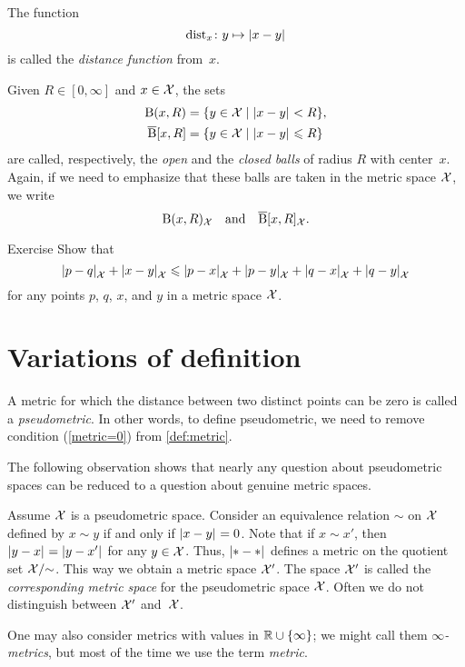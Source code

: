 The function 
\[\distfun_x\:y\mapsto \dist{x}{y}{}\]
is called the \emph{distance function} from~$x$. 

Given $R\in[0,\infty]$ and $x\in \mathcal{X}$, the sets
\begin{align*}
\oBall(x,R)&=\{y\in \spc{X}\mid \dist{x}{y}{}<R\},
\\
\cBall[x,R]&=\{y\in \spc{X}\mid \dist{x}{y}{}\le R\}
\end{align*}
are called, respectively, the  \emph{open} and  the \emph{closed  balls}   of radius $R$ with center~$x$.
Again, if we need to emphasize that these balls are taken in the metric space $\mathcal{X}$,
we write 
\[\mathrm{B}{}(x,R)_{\mathcal{X}}\quad\text{and}\quad\overline{\mathrm{B}}{}[x,R]_{\mathcal{X}}.\]

\begin{thm}{Exercise}
Show that
\[\dist{p}{q}{\spc{X}}+\dist{x}{y}{\spc{X}}\le\dist{p}{x}{\spc{X}}+\dist{p}{y}{\spc{X}}+\dist{q}{x}{\spc{X}}+\dist{q}{y}{\spc{X}}\]
for any points $p$, $q$, $x$, and $y$ in a metric space $\mathcal{X}$.
\end{thm}

\section{Variations of definition}

A metric for which the distance between two distinct points can be zero is called a \emph{pseudometric}.
In other words, to define pseudometric, we need to remove condition (\ref{metric=0}) from \ref{def:metric}.

The following observation shows that
nearly any question about pseudometric spaces can be reduced to a question about genuine metric spaces.

Assume $\mathcal{X}$ is a pseudometric space.
Consider an equivalence relation $\sim$ on $\mathcal{X}$ defined by
$x\sim y$ if and only if $\dist{x}{y}{}=0$. 
Note that if $x\sim x'$, then $\dist{y}{x}{}=\dist{y}{x'}{}$ for any $y\in\mathcal{X}$.
Thus, $\dist{*}{*}{}$ defines a metric on the
quotient set $\mathcal{X}/{\sim}$.
This way we obtain a metric space $\mathcal{X}'$.
The space $\mathcal{X}'$ is called the 
\emph{corresponding metric space} for the pseudometric space $\mathcal{X}$.
Often we do not distinguish between $\mathcal{X}'$ and~$\mathcal{X}$. 

One may also consider metrics with values in $\mathbb{R}\cup\{\infty\}$;
we might call them \emph{$\infty$-metrics}, but most of the time we use the term {}\emph{metric}.

